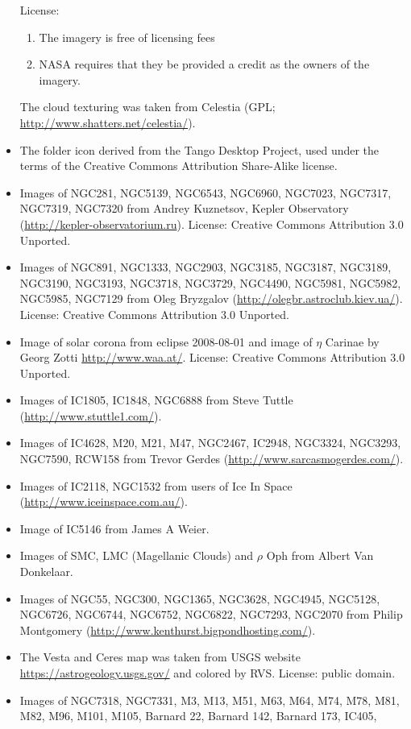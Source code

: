 \begin{itemize}
	  License: \begin{enumerate}
	                  \item The imagery is free of licensing fees
		              \item NASA requires that they be provided a credit as the owners of the imagery.
                \end{enumerate}
	  The cloud texturing was taken from Celestia (GPL; \url{http://www.shatters.net/celestia/}).
\item The folder icon derived from the Tango Desktop Project, used under the terms of the Creative Commons Attribution Share-Alike license.
\item Images of NGC281, NGC5139, NGC6543, NGC6960, NGC7023, NGC7317, NGC7319, NGC7320
	  from Andrey Kuznetsov, Kepler Observatory (\url{http://kepler-observatorium.ru}). 
	  License: Creative Commons Attribution 3.0 Unported.
\item Images of NGC891, NGC1333, NGC2903, NGC3185, NGC3187, NGC3189, NGC3190, NGC3193, NGC3718, NGC3729, NGC4490, NGC5981, NGC5982, NGC5985, NGC7129 
	  from Oleg Bryzgalov (\url{http://olegbr.astroclub.kiev.ua/}). License: Creative Commons Attribution 3.0 Unported.
\item Image of solar corona from eclipse 2008-08-01 and image of $\eta$ Carinae by Georg Zotti \url{http://www.waa.at/}. License: Creative Commons Attribution 3.0 Unported.
\item Images of IC1805, IC1848, NGC6888 from Steve Tuttle (\url{http://www.stuttle1.com/}).
\item Images of IC4628, M20, M21, M47, NGC2467, IC2948, NGC3324, NGC3293, NGC7590, RCW158 from Trevor Gerdes (\url{http://www.sarcasmogerdes.com/}).
\item Images of IC2118, NGC1532 from users of Ice In Space (\url{http://www.iceinspace.com.au/}).
\item Image of IC5146 from James A Weier.
\item Images of SMC, LMC (Magellanic Clouds) and $\rho$ Oph from Albert Van Donkelaar.
\item Images of NGC55, NGC300, NGC1365, NGC3628, NGC4945, NGC5128, NGC6726, NGC6744, NGC6752, NGC6822, NGC7293, NGC2070
	  from Philip Montgomery (\url{http://www.kenthurst.bigpondhosting.com/}).
\item The Vesta and Ceres map was taken from USGS website \url{https://astrogeology.usgs.gov/} and colored by RVS. License: public domain.
\item Images of NGC7318, NGC7331, M3, M13, M51, M63, M64, M74, M78, M81, M82, M96, M101, M105, Barnard 22, Barnard 142, Barnard 173, IC405,

\end{itemize}
